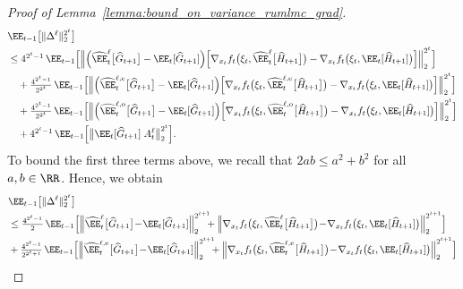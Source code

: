 \documentclass[11pt]{article}
\let\hat\widehat
\begin{document}
\begin{proof}[Proof of Lemma~\ref{lemma:bound_on_variance_rumlmc_grad}]
\begin{align*}
    & \EE_{t-1}\big[\|\Delta^\ell \|_{2}^{2^t}\big]\\
    & \leq {\textstyle 4^{2^t-1}} \, \EE_{t-1}\Big[\Big\|\Big( \hat\EE_t^{\ell}\big[\hat{G}_{t+1}\big] -\EE_t[\hat{G}_{t+1}] \Big) \Big[\nabla_{x_t} f_t \big(\xi_t, \hat\EE_t^{\ell}\big[\hat{H}_{t+1}\big]\big) - \nabla_{x_t} f_t\big(\xi_t, \EE_t[\hat{H}_{t+1}] \big)\Big] \Big\|_{2}^{2^t}\Big]\\
    & \quad +{\textstyle \frac{4^{2^t-1}}{2^{2^t}}} \, \EE_{t-1}\Big[\Big\|\Big( \hat\EE_t^{\ell, {\rm e}}\big[\hat{G}_{t+1}\big] -\EE_t[\hat{G}_{t+1}] \Big) \Big[\nabla_{x_t} f_t \big(\xi_t, \hat\EE_t^{\ell, {\rm e}}\big[\hat{H}_{t+1}\big]\big) - \nabla_{x_t} f_t\big(\xi_t, \EE_t[\hat{H}_{t+1}] \big)\Big] \Big\|_{2}^{2^t}\Big]\\
    & \quad +{\textstyle \frac{4^{2^t-1}}{2^{2^t}}} \, \EE_{t-1}\Big[\Big\|\Big( \hat\EE_t^{\ell, {\rm o}}\big[\hat{G}_{t+1}\big] -\EE_t[\hat{G}_{t+1}] \Big) \Big[ \nabla_{x_t} f_t \big(\xi_t, \hat\EE_t^{\ell, {\rm o}}\big[\hat{H}_{t+1}\big]\big) - \nabla_{x_t} f_t\big(\xi_t, \EE_t[\hat{H}_{t+1}] \big)\Big]\Big\|_{2}^{2^t}\Big]\\
    & \quad +{\textstyle 4^{2^t-1}} \, \EE_{t-1}\Big[\big\|\EE_t[\hat{G}_{t+1}] \; A^\ell_t\big\|_{2}^{2^t}\Big].
\end{align*}
To bound the first three terms above, we recall that $2ab\leq a^2 + b^2$ for all $a,b\in\RR$. Hence, we obtain
\begin{equation}
\label{eq:2t-th-moment-delta}
 \begin{aligned}
    & \EE_{t-1}\big[\|\Delta^\ell \|_{2}^{2^t}\big]\\
    & \leq {\textstyle \frac{4^{2^t-1}}{2}} \, \EE_{t-1}\Big[\Big\|\hat\EE_t^{\ell}\big[\hat{G}_{t+1}\big] \! - \! \EE_t[\hat{G}_{t+1}]  \Big\|_{2}^{2^{t+1}} \hspace{-2mm} + \Big\|\nabla_{x_t} f_t \big(\xi_t, \hat\EE_t^{\ell}\big[\hat{H}_{t+1}\big]\big) \! - \!  \nabla_{x_t} f_t\big(\xi_t, \EE_t[\hat{H}_{t+1}] \big) \Big\|_{2}^{2^{t+1}}\Big]\\
    &+{\textstyle \frac{4^{2^t-1}}{2^{2^t+1}}} \, \EE_{t-1}\Big[\Big\| \hat\EE_t^{\ell, {\rm e}}\big[\hat{G}_{t+1}\big] \! - \! \EE_t[\hat{G}_{t+1}] \Big\|_{2}^{2^{t+1}} \hspace{-2mm} + \Big\|\nabla_{x_t} f_t \big(\xi_t, \hat\EE_t^{\ell, {\rm e}}\big[\hat{H}_{t+1}\big]\big) \! - \! \nabla_{x_t} f_t\big(\xi_t, \EE_t[\hat{H}_{t+1}] \big)\Big\|_{2}^{2^{t+1}}\Big]\\

\end{aligned}
\end{equation}
\end{proof}
\end{document}
